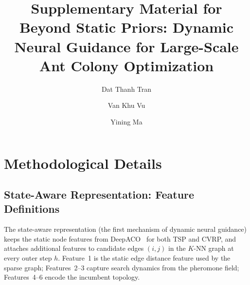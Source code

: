 \documentclass[sigconf,nonacm]{acmart}
\begin{document}
\title[Supplementary Material]{Supplementary Material for\\Beyond Static Priors: Dynamic Neural Guidance for Large-Scale Ant Colony Optimization}

\author{Dat Thanh Tran}

\author{Van Khu Vu}

\author{Yining Ma}

\maketitle

\appendix

\setcounter{table}{0}
\renewcommand{\thetable}{A\arabic{table}}
\setcounter{figure}{0}
\renewcommand{\thefigure}{A\arabic{figure}}
\setcounter{algorithm}{0}
\renewcommand{\thealgorithm}{A\arabic{algorithm}}

\section{Methodological Details}
\label{app:method}

\subsection{State-Aware Representation: Feature Definitions}
\label{app:state-features}

The state-aware representation (the first mechanism of dynamic neural guidance) keeps the static node features from DeepACO~\cite{deepaco} for both TSP and CVRP, and attaches additional features to candidate edges $(i,j)$ in the $K$-NN graph at every outer step $h$.
Feature~1 is the static edge distance feature used by the sparse graph; Features~2--3 capture search dynamics from the pheromone field; Features~4--6 encode the incumbent topology.
\end{document}
